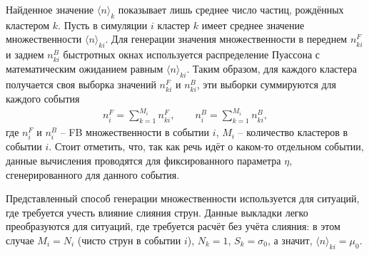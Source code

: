 Найденное значение $\langle n \rangle_k$ показывает лишь среднее число частиц, рождённых кластером $k$. Пусть в симуляции $i$ кластер $k$ имеет среднее значение множественности $\langle n \rangle_{ki}$. Для генерации значения множественности в переднем $n^F_{ki}$ и заднем $n^B_{ki}$ быстротных окнах используется распределение Пуассона с математическим ожиданием равным $\langle n \rangle_{ki}$. Таким образом, для каждого кластера получается своя выборка значений $n^F_{ki}$ и $n^B_{ki}$, эти выборки суммируются для каждого события 
\begin{equation} \label{eq:nfnb}
\begin{split}
	n^F_i = \sum_{k = 1}^{M_i} n^F_{ki}, \qquad n^B_i = \sum_{k = 1}^{M_i} n^B_{ki},
\end{split}
\end{equation}
где $n^F_i$ и $n^B_i$ -- FB множественности в событии $i$, $M_i$ -- количество кластеров в событии $i$. Стоит отметить, что, так как речь идёт о каком-то отдельном событии, данные вычисления проводятся для фиксированного параметра $\eta$, сгенерированного для данного события. 

Представленный способ генерации множественности используется для ситуаций, где требуется учесть влияние слияния струн. Данные выкладки легко преобразуются для ситуаций, где требуется расчёт без учёта слияния: в этом случае $M_i = N_i$ (чисто струн в событии $i$), $N_k = 1$, $S_k = \sigma_0$, а значит, $\langle n \rangle_{ki} = \mu_0$.
